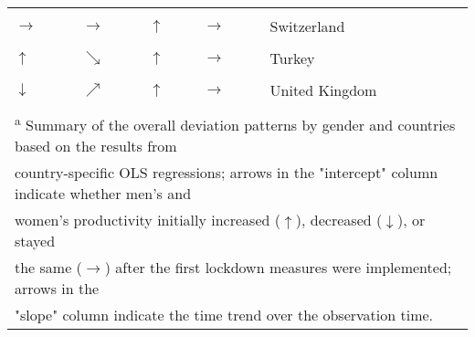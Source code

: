 \begin{table}[!h]
\begin{tabular}[t]{lllll}
\addlinespace
\cellcolor{gray!6}{$\rightarrow$} & \cellcolor{gray!6}{$\rightarrow$} & \cellcolor{gray!6}{$\uparrow$} & \cellcolor{gray!6}{$\searrow$} & \cellcolor{gray!6}{Spain}\\
$\rightarrow$ & $\rightarrow$ & $\uparrow$ & $\rightarrow$ & Switzerland\\
\cellcolor{gray!6}{$\rightarrow$} & \cellcolor{gray!6}{$\nearrow$} & \cellcolor{gray!6}{$\rightarrow$} & \cellcolor{gray!6}{$\nearrow$} & \cellcolor{gray!6}{Taiwan}\\
$\uparrow$ & $\searrow$ & $\uparrow$ & $\rightarrow$ & Turkey\\
\cellcolor{gray!6}{$\rightarrow$} & \cellcolor{gray!6}{$\rightarrow$} & \cellcolor{gray!6}{$\uparrow$} & \cellcolor{gray!6}{$\searrow$} & \cellcolor{gray!6}{Ukraine}\\
\addlinespace
$\downarrow$ & $\nearrow$ & $\uparrow$ & $\rightarrow$ & United Kingdom\\
\cellcolor{gray!6}{$\rightarrow$} & \cellcolor{gray!6}{$\rightarrow$} & \cellcolor{gray!6}{$\uparrow$} & \cellcolor{gray!6}{$\rightarrow$} & \cellcolor{gray!6}{United States}\\
\bottomrule
\multicolumn{5}{l}{\textsuperscript{a} Summary of the overall deviation patterns by gender and countries based on the results from}\\
\multicolumn{5}{l}{country-specific OLS regressions; arrows in the "intercept" column indicate whether men's and}\\
\multicolumn{5}{l}{women's productivity initially increased ($\uparrow$), decreased ($\downarrow$), or stayed}\\
\multicolumn{5}{l}{the same ($\rightarrow$) after the first lockdown measures were implemented; arrows in the}\\
\multicolumn{5}{l}{"slope" column indicate the time trend over the observation time.}\\
\end{tabular}
\end{table}
